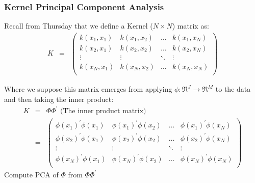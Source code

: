 \begin{frame}[fragile]
\frametitle{Kernel Principal Component Analysis}
Recall from Thursday that we define a \alert{Kernel} ($N \times N$) matrix as:
\begin{eqnarray}
{K} & = & \begin{pmatrix}
k({x}_{1}, {x}_{1}) & k({x}_{1}, {x}_{2}) & \hdots & k({x}_{1}, x_{N}) \\
k({x}_{2}, {x}_{1}) & k({x}_{2}, {x}_{2}) & \hdots & k({x}_{2}, {x}_{N}) \\
\vdots & \vdots & \ddots & \vdots \\
k({x}_{N}, {x}_{1}) & k({x}_{N}, {x}_{2}) & \hdots & k({x}_{N}, {x}_{N}) \\
\end{pmatrix}\nonumber 
\end{eqnarray}
 
Where we suppose this matrix emerges from applying $\phi: \Re^{J} \rightarrow \Re^{M}$ to the data and then taking the inner product:  
\begin{eqnarray}
{K} & = & {\Phi}{\Phi}^{'} \text{ (The inner product matrix)} \nonumber \\
& = & \begin{pmatrix}
\phi({x}_{1})^{'}\phi({x}_{1}) & \phi({x}_{1})^{'}\phi({x}_{2}) & \hdots & \phi({x}_{1})^{'}\phi({x}_{N}) \nonumber \\
\phi({x}_{2})^{'}\phi({x}_{1}) & \phi({x}_{2})^{'}\phi({x}_{2}) & \hdots & \phi({x}_{2})^{'}\phi({x}_{N})\\
\vdots & \vdots & \ddots & \vdots \\
\phi({x}_{N})^{'}\phi({x}_{1}) & \phi({x}_{N})^{'}\phi({x}_{2}) & \hdots & \phi({x}_{N})^{'}\phi({x}_{N}) \\
\end{pmatrix} \nonumber 
\end{eqnarray}
\alert{Compute PCA of ${\Phi}$ from ${\Phi}{\Phi}^{'}$ }
\end{frame}


